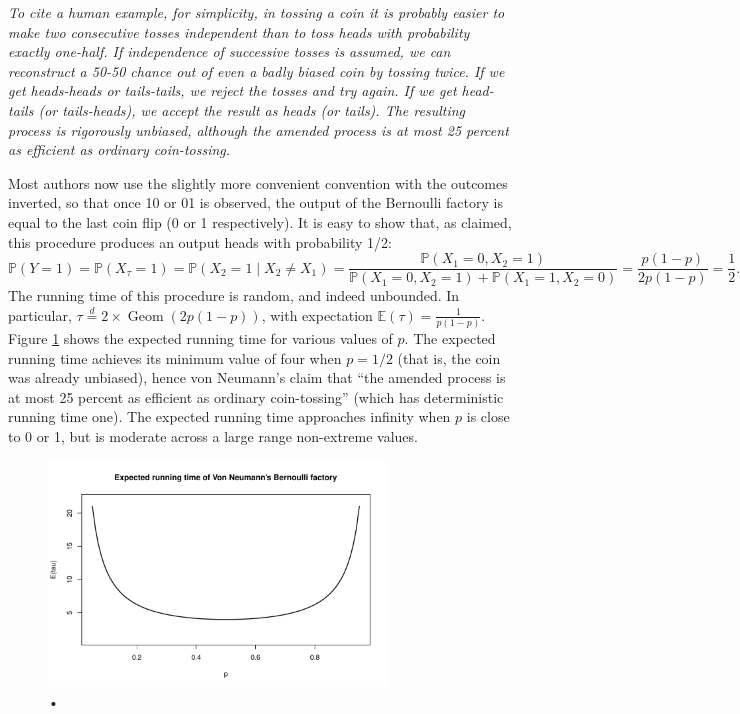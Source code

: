 \documentclass{article}
\theoremstyle{definition}
\newcommand{\PR}{\mathbb{P}}
\newcommand{\E}{\mathbb{E}}
\newcommand{\eqdist}{\overset{d}{=}}
\newcommand{\Geom}{\operatorname{Geom}}
\begin{document}
\begin{displayquote}
\textit{To cite a human example, for simplicity, in tossing a coin it is probably easier to make two consecutive tosses independent than to toss heads with probability exactly one-half. If independence of successive tosses is assumed, we can reconstruct a 50-50 chance out of even a badly biased coin by tossing twice. If we get heads-heads or tails-tails, we reject the tosses and try again. If we get head-tails (or tails-heads), we accept the result as heads (or tails). The resulting process is rigorously unbiased, although the amended process is at most 25 percent as efficient as ordinary coin-tossing.}
\end{displayquote}
Most authors now use the slightly more convenient convention with the outcomes inverted, so that once 10 or 01 is observed, the output of the Bernoulli factory is equal to the last coin flip (0 or 1 respectively). 
It is easy to show that, as claimed, this procedure produces an output heads with probability 1/2:
\begin{equation*}
\PR(Y=1) = \PR(X_\tau = 1) = \PR(X_2 = 1 \mid X_2\neq X_1) = \frac{\PR(X_1 = 0, X_2 = 1)}{\PR(X_1 = 0, X_2 = 1) + \PR(X_1 = 1, X_2 = 0)} = \frac{p(1-p)}{2p(1-p)} = \frac{1}{2}.
\end{equation*}
The running time of this procedure is random, and indeed unbounded. In particular, $\tau \eqdist 2\times\Geom(2p(1-p))$, with expectation $\E(\tau) = \frac{1}{p(1-p)}$. Figure \ref{fig:runtime_const2} shows the expected running time for various values of $p$. The expected running time achieves its minimum value of four when $p=1/2$ (that is, the coin was already unbiased), hence von Neumann's claim that ``the amended process is at most 25 percent as efficient as ordinary coin-tossing'' (which has deterministic running time one). The expected running time approaches infinity when $p$ is close to 0 or 1, but is moderate across a large range non-extreme values.\\

\begin{figure}
\centering
\includegraphics[width=0.8\textwidth]{vonneu_runtime.pdf}
\caption{•}
\label{fig:runtime_const2}
\end{figure}
\end{document}
